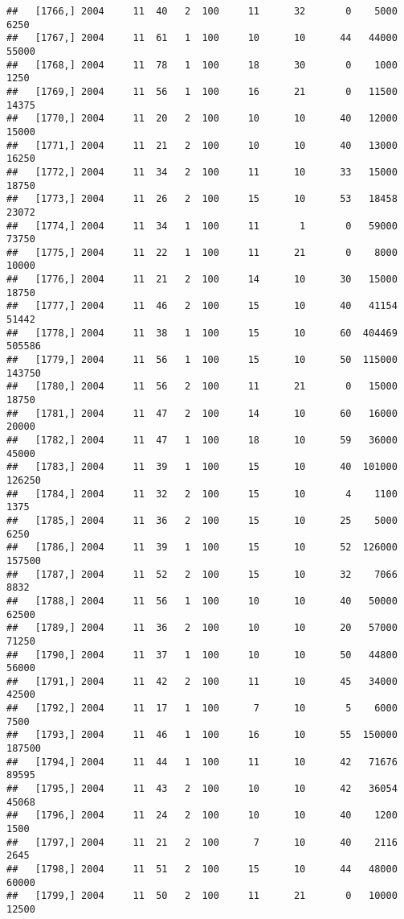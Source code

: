 \documentclass{article}\usepackage[]{graphicx}\usepackage[]{color}
\makeatletter
\newenvironment{kframe}{%
 \def\at@end@of@kframe{}%
 \ifinner\ifhmode%
  \def\at@end@of@kframe{\end{minipage}}%
  \begin{minipage}{\columnwidth}%
 \fi\fi%
 \def\FrameCommand##1{\hskip\@totalleftmargin \hskip-\fboxsep
 \colorbox{shadecolor}{##1}\hskip-\fboxsep
     \hskip-\linewidth \hskip-\@totalleftmargin \hskip\columnwidth}%
 \MakeFramed {\advance\hsize-\width
   \@totalleftmargin\z@ \linewidth\hsize
   \@setminipage}}%
 {\par\unskip\endMakeFramed%
 \at@end@of@kframe}
\newenvironment{knitrout}{}{} %
\makeatother
\begin{document}
\begin{knitrout}
\begin{kframe}
\begin{verbatim}
##   [1766,] 2004     11  40   2  100     11      32       0    5000    6250
##   [1767,] 2004     11  61   1  100     10      10      44   44000   55000
##   [1768,] 2004     11  78   1  100     18      30       0    1000    1250
##   [1769,] 2004     11  56   1  100     16      21       0   11500   14375
##   [1770,] 2004     11  20   2  100     10      10      40   12000   15000
##   [1771,] 2004     11  21   2  100     10      10      40   13000   16250
##   [1772,] 2004     11  34   2  100     11      10      33   15000   18750
##   [1773,] 2004     11  26   2  100     15      10      53   18458   23072
##   [1774,] 2004     11  34   1  100     11       1       0   59000   73750
##   [1775,] 2004     11  22   1  100     11      21       0    8000   10000
##   [1776,] 2004     11  21   2  100     14      10      30   15000   18750
##   [1777,] 2004     11  46   2  100     15      10      40   41154   51442
##   [1778,] 2004     11  38   1  100     15      10      60  404469  505586
##   [1779,] 2004     11  56   1  100     15      10      50  115000  143750
##   [1780,] 2004     11  56   2  100     11      21       0   15000   18750
##   [1781,] 2004     11  47   2  100     14      10      60   16000   20000
##   [1782,] 2004     11  47   1  100     18      10      59   36000   45000
##   [1783,] 2004     11  39   1  100     15      10      40  101000  126250
##   [1784,] 2004     11  32   2  100     15      10       4    1100    1375
##   [1785,] 2004     11  36   2  100     15      10      25    5000    6250
##   [1786,] 2004     11  39   1  100     15      10      52  126000  157500
##   [1787,] 2004     11  52   2  100     15      10      32    7066    8832
##   [1788,] 2004     11  56   1  100     10      10      40   50000   62500
##   [1789,] 2004     11  36   2  100     10      10      20   57000   71250
##   [1790,] 2004     11  37   1  100     10      10      50   44800   56000
##   [1791,] 2004     11  42   2  100     11      10      45   34000   42500
##   [1792,] 2004     11  17   1  100      7      10       5    6000    7500
##   [1793,] 2004     11  46   1  100     16      10      55  150000  187500
##   [1794,] 2004     11  44   1  100     11      10      42   71676   89595
##   [1795,] 2004     11  43   2  100     10      10      42   36054   45068
##   [1796,] 2004     11  24   2  100     10      10      40    1200    1500
##   [1797,] 2004     11  21   2  100      7      10      40    2116    2645
##   [1798,] 2004     11  51   2  100     15      10      44   48000   60000
##   [1799,] 2004     11  50   2  100     11      21       0   10000   12500

\end{verbatim}
\end{kframe}
\end{knitrout}
\end{document}
